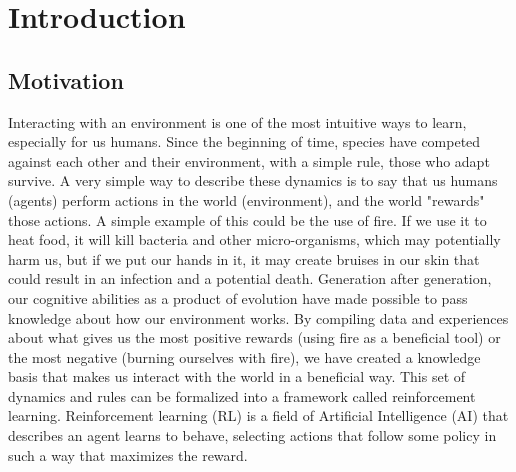 
\chapter{Introduction}
\label{cha:intro}

\section{Motivation}
\label{sec:motivation}
Interacting with an environment is one of the most intuitive ways to learn, especially for us humans. Since the beginning of time, species have competed against each other and their environment, with a simple rule, those who adapt survive. A very simple way to describe these dynamics is to say that us humans (agents) perform actions in the world (environment), and the world "rewards" those actions. A simple example of this could be the use of fire. If we use it to heat food, it will kill bacteria and other micro-organisms, which may potentially harm us, but if we put our hands in it, it may create bruises in our skin that could result in an infection and a potential death. Generation after generation, our cognitive abilities as a product of evolution have made possible to pass knowledge about how our environment works. By compiling data and experiences about what gives us the most positive rewards (using fire as a beneficial tool) or the most negative (burning ourselves with fire), we have created a knowledge basis that makes us interact with the world in a beneficial way. This set of dynamics and rules can be formalized into a framework called reinforcement learning. Reinforcement learning (RL) is a field of Artificial Intelligence (AI) that describes an agent learns to behave, selecting actions that follow some policy in such a way that maximizes the reward. 

